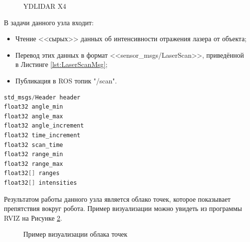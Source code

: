 \documentclass[12pt,a4paper]{scrartcl}
\begin{document}
				\begin{figure}[h]
					\caption{YDLIDAR X4}
					\label{fig:ydlidarx4}
				\end{figure}
				
				В задачи данного узла входит:
				\begin{itemize}
					\item Чтение <<сырых>> данных об интенсивности отражения лазера от объекта;
					\item Перевод этих данных в формат <<sensor\_msgs/LaserScan>>, приведённой в Листинге \ref{lst:LaserScanMsg}\cite{bib:ROSScanMsg};
					\item Публикация в ROS топик "/scan".
				\end{itemize}
				
				\begin{lstlisting}[language=C,caption={Формат сообщения sensor\_msgs/LaserScan},label={lst:LaserScanMsg}]
std_msgs/Header header
float32 angle_min
float32 angle_max
float32 angle_increment
float32 time_increment
float32 scan_time
float32 range_min
float32 range_max
float32[] ranges
float32[] intensities
				\end{lstlisting}	
				
				Результатом работы данного узла является облако точек, которое показывает препятствия вокруг робота\cite{bib:lidarDescription}. Пример визуализации можно увидеть из программы RVIZ на Рисунке \ref{fig:LaserScan}\cite{bib:PointCloudViz}.
				
				\begin{figure}[h]
					\caption{Пример визуализации облака точек}
					\label{fig:LaserScan}
				\end{figure}
				
\end{document}

